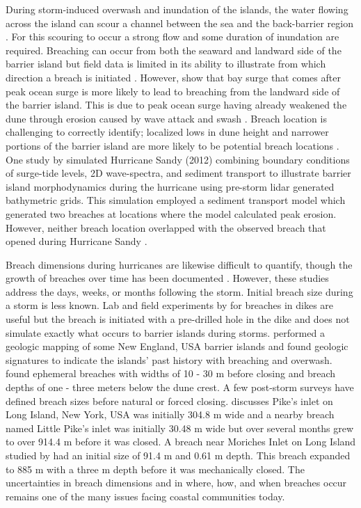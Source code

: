 \documentclass{coastal_paper}
\begin{document}
During storm-induced overwash and inundation of the islands, the water flowing across the island can scour a channel between the sea and the back-barrier region \citep{Kraus2003, Pierce1970, Roelvink2009}. For this scouring to occur a strong flow and some duration of inundation are required. Breaching can occur from both the seaward and landward side of the barrier island but field data is limited in its ability to illustrate from which direction a breach is initiated \citep{Kraus2003, Pierce1970, Smallegan2017}. However, \citet{Smallegan2017} show that bay surge that comes after peak ocean surge is more likely to lead to breaching from the landward side of the barrier island. This is due to peak ocean surge having already weakened the dune through erosion caused by wave attack and swash \citep{Kraus2003, Smallegan2017}. Breach location is challenging to correctly identify; localized lows in dune height and narrower portions of the barrier island are more likely to be potential breach locations \citep{Kraus2003, Kraus2003a}. One study by \citet{Vander2019} simulated Hurricane Sandy (2012) combining boundary conditions of surge-tide levels, 2D wave-spectra, and sediment transport to illustrate barrier island morphodynamics during the hurricane using pre-storm lidar generated bathymetric grids. This simulation employed a sediment transport model which generated two breaches at locations where the model calculated peak erosion. However, neither breach location overlapped with the observed breach that opened during Hurricane Sandy \citep{Vander2019}.

Breach dimensions during hurricanes are likewise difficult to quantify, though the growth of breaches over time has been documented \citep{Kraus2003a, Schmeltz1983Breach/InletInlet.}. However, these studies address the days, weeks, or months following the storm. Initial breach size during a storm is less known. Lab and field experiments by \citet{Visser1999} for breaches in dikes are useful but the breach is initiated with a pre-drilled hole in the dike and does not simulate exactly what occurs to barrier islands during storms. \citet{Buynevich2006} performed a geologic mapping of some New England, USA barrier islands and found geologic signatures to indicate the islands' past history with breaching and overwash. \citet{Buynevich2006} found ephemeral breaches with widths of 10 - 30 m before closing and breach depths of one - three meters below the dune crest. A few post-storm surveys have defined breach sizes before natural or forced closing. \cite{Kraus2003a} discusses Pike's inlet on Long Island, New York, USA was initially 304.8 m wide and a nearby breach named Little Pike's inlet was initially 30.48 m wide but over several months grew to over 914.4 m before it was closed. A breach near Moriches Inlet on Long Island studied by \cite{Schmeltz1983Breach/InletInlet.} had an initial size of 91.4 m and 0.61 m depth. This breach expanded to 885 m with a three m depth before it was mechanically closed. The uncertainties in breach dimensions and  in where, how, and when breaches occur remains one of the many issues facing coastal communities today.
\end{document}
